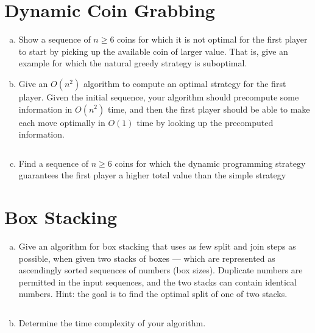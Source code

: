 \documentclass[12pt]{article}
\begin{document}
\maketitle

\section{Dynamic Coin Grabbing}\label{coin grabbing}
\begin{enumerate}[(a)]
\item Show a sequence of $n \geq 6$ coins for which it is not optimal for the first player to start by picking up the available coin of larger value. That is, give an example for which the natural greedy strategy is suboptimal.
\begin{addmargin}[2em]{2em}

\end{addmargin}
\item Give an $O(n^2)$ algorithm to compute an optimal strategy for the first player. Given the initial sequence,
your algorithm should precompute some information in $O(n^2)$ time, and then the first player should be
able to make each move optimally in $O(1)$ time by looking up the precomputed information.
\begin{addmargin}[2em]{2em}
\begin{lstlisting}

\end{lstlisting}
\end{addmargin}
\item Find a sequence of $n \geq 6$ coins for which the dynamic programming strategy guarantees the first player a higher total value than the simple strategy
\begin{addmargin}[2em]{2em}

\end{addmargin}
\end{enumerate}

\section{Box Stacking}\label{box stacking}
\begin{enumerate}[(a)]
\item Give an algorithm for box stacking that uses as few split and join steps as possible, when given two stacks of boxes — which are represented as ascendingly sorted sequences of numbers (box sizes). Duplicate numbers are permitted in the input sequences, and the two stacks can contain identical numbers. Hint: the goal is to find the optimal split of one of two stacks.
\begin{addmargin}[2em]{2em}
\begin{lstlisting}

\end{lstlisting}
\end{addmargin}
\item Determine the time complexity of your algorithm.
\begin{addmargin}[4em]{2em}

\end{addmargin}
\end{enumerate}
\end{document}
